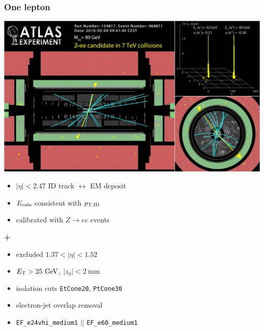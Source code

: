 \begin{frame}\frametitle{One lepton}
\footnotesize\centering

\begin{minipage}{.5\textwidth}\centering
\includegraphics[width=.9\textwidth,height=0.3\textheight]{pics/Zee}

\begin{itemize}
\item $|\eta|<2.47$ ID track $\leftrightarrow$ EM deposit
\item $E_{\rm calo}$ consistent with $p_{\rm T, ID}$
\item calibrated with $Z\to ee$ events
\end{itemize}
{\cccolor \bfseries +}\\
\begin{itemize}
\item excluded $1.37< |\eta|< 1.52$
\item $\et > 25\gev$, $|z_0|<2~$mm
\item isolation cuts {\scriptsize\texttt{EtCone20}, \texttt{PtCone30}}
\item electron-jet overlap removal
\item {\scriptsize\texttt{EF\_e24vhi\_medium1} $||$ \texttt{EF\_e60\_medium1}}
\end{itemize}


\end{minipage}\begin{minipage}{.5\textwidth}\centering



\end{minipage}
\end{frame}
